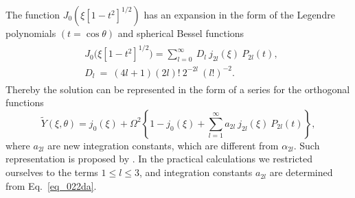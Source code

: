 \documentclass{caosp308}
\begin{document}
The function $J_0 (\xi[1-t^2]^{1/2})$ has an expansion in the form of the Legendre polynomials $(t=\cos\theta)$ and spherical Bessel functions \citep*{1970hmfw.book.....A}
\begin{eqnarray}
\label{eq_033da}
\begin{split}
&J_0 \bigl(\xi[1-t^2]^{1/2}\bigl) = \sum^{\infty}_{l=0}\:D_l\:j_{2l} (\xi)\:P_{2l} (t),\,\\
&D_l\: = \:(4l+1)(2l)! \:2^{-2l} \:(l!)^{-2}.
\end{split}
\end{eqnarray}
Thereby the solution can be represented in the form of a series for the orthogonal functions
\begin{equation}
\label{eq_034da}
\tilde{Y}(\xi,\theta)=j_0(\xi)+\Omega^2\left\{1-j_0(\xi)+\sum^{\infty}_{l=1}a_{2l}\:j_{2l}(\xi)\:P_{2l}(t)\right\},
\end{equation}
where $a_{2l}$ are  new integration constants, which are different from $\alpha_{2l}$. Such representation is proposed by \citet{2019MMC.6...153V}. In the practical calculations we restricted ourselves to the terms $1 \leq l\leq 3$, and integration constants $a_{2l}$ are determined from Eq.~\eqref{eq_022da}.
\end{document}
